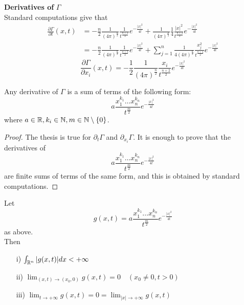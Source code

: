 \textbf{Derivatives of} $\Gamma$\\
Standard computations give that 
\begin{align*}
    \frac{\partial \Gamma}{\partial t}(x,t) &= -\frac{n}{2} \frac{1}{(4 \pi)^\frac{n}{2}} \frac{1}{t^\frac{n+2}{2}} e^{- \frac{|x|^2}{4t}} + \frac{1}{(4 \pi)^\frac{n}{2}} \frac{1}{4} \frac{|x|^2}{t^ \frac{n+4}{2}} e^{- \frac{|x|^2}{4t}} \\
    &= - \frac{n}{2} \frac{1}{(4 \pi)^\frac{n}{2}} \frac{1}{t^\frac{n+2}{2}}e^{-\frac{|x|^2}{4t}} + \sum_{j=1}^n \frac{1}{4 (4 \pi)^\frac{n}{2}} \frac{x_j^2}{t^\frac{n+4}{2}} e^{-\frac{|x|^2}{4t}}
\end{align*}
\begin{equation*}
    \frac{\partial \Gamma}{\partial x_i}(x,t) = -\frac{1}{2} \frac{1}{(4 \pi)^\frac{n}{2}} \frac{x_i}{t^\frac{n+2}{2}} e^{- \frac{|x|^2}{4t}}
\end{equation*}
\begin{PropBox}
    \begin{Proposition}
        Any derivative of $\Gamma$ is a sum of terms of the following form:
        \begin{equation*}
            a \frac{x_1^{k_1}\ldots x_n^{k_n}}{t^\frac{m}{2}} e^{-\frac{|x|^2}{4t}}
        \end{equation*}
        where $a \in \mathbb{R}, k_i \in \mathbb{N}, m \in \mathbb{N} \setminus \{0\}$.
    \end{Proposition}
\end{PropBox}
\begin{ProofBox}
    \begin{proof}
    The thesis is true for $\partial_t \Gamma$ and $\partial_{x_i} \Gamma$. It is enough to prove that the derivatives of 
    \begin{equation*}
            a \frac{x_1^{k_1}\ldots x_n^{k_n}}{t^\frac{m}{2}} e^{-\frac{|x|^2}{4t}}
        \end{equation*}
        are finite sums of terms of the same form, and this is obtained by standard computations. 
\end{proof}
\end{ProofBox}
\begin{PropBox}
    \begin{Lemma}
        Let 
        \begin{equation*}
            g(x,t) = a \frac{x_1^{k_1}\ldots x_n^{k_n}}{t^\frac{m}{2}} e^{-\frac{|x|^2}{4t}}
        \end{equation*}
        as above. \\
        Then
        \begin{itemize}
            \item [i)] $\int_{\mathbb{R}^n} |g(x,t)| dx < +\infty$\\
            \item [ii)] $\lim_{(x,t) \rightarrow (x_0, 0)} g(x,t) = 0 \quad (x_0 \neq 0, t> 0)$
            \item [iii)] $\lim_{t \rightarrow +\infty} g(x,t) = 0 = \lim_{|x| \rightarrow +\infty} g(x,t)$
        \end{itemize}
    \end{Lemma}
\end{PropBox}
